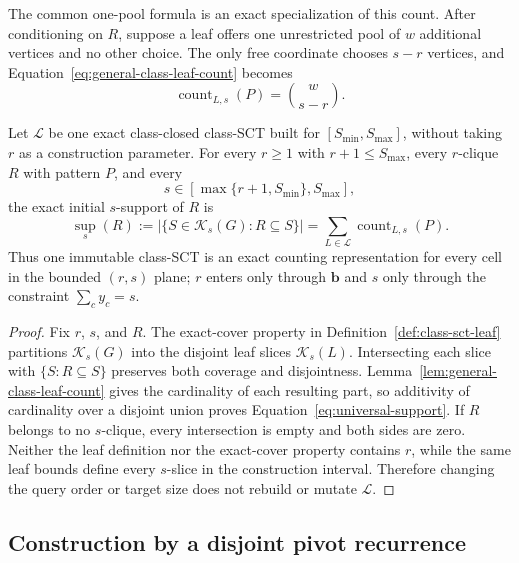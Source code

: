 The common one-pool formula is an exact specialization of this count.
%
After conditioning on $R$, suppose a leaf offers one unrestricted pool of $w$ additional vertices and no other choice.
%
The only free coordinate chooses $s-r$ vertices, and Equation~\eqref{eq:general-class-leaf-count} becomes
\begin{equation}
\label{eq:single-pool-special-case}
\operatorname{count}_{L,s}(P)=\binom{w}{s-r}.
\end{equation}

\begin{theorem}
\label{thm:universal-cpi}
Let $\mathcal L$ be one exact class-closed class-SCT built for $[S_{\min},S_{\max}]$, without taking $r$ as a construction parameter.
%
For every $r\geq1$ with $r+1\leq S_{\max}$, every $r$-clique $R$ with pattern $P$, and every
\[
s\in[\max\{r+1,S_{\min}\},S_{\max}],
\]
the exact initial $s$-support of $R$ is
\begin{equation}
\label{eq:universal-support}
\operatorname{sup}_s(R)
:=
|\{S\in\mathcal K_s(G):R\subseteq S\}|
=
\sum_{L\in\mathcal L}\operatorname{count}_{L,s}(P).
\end{equation}
Thus one immutable class-SCT is an exact counting representation for every cell in the bounded $(r,s)$ plane; $r$ enters only through $\mathbf b$ and $s$ only through the constraint $\sum_cy_c=s$.
\end{theorem}
\begin{proof}
Fix $r$, $s$, and $R$.
%
The exact-cover property in Definition~\ref{def:class-sct-leaf} partitions $\mathcal K_s(G)$ into the disjoint leaf slices $\mathcal K_s(L)$.
%
Intersecting each slice with $\{S:R\subseteq S\}$ preserves both coverage and disjointness.
%
Lemma~\ref{lem:general-class-leaf-count} gives the cardinality of each resulting part, so additivity of cardinality over a disjoint union proves Equation~\eqref{eq:universal-support}.
%
If $R$ belongs to no $s$-clique, every intersection is empty and both sides are zero.
%
Neither the leaf definition nor the exact-cover property contains $r$, while the same leaf bounds define every $s$-slice in the construction interval.
%
Therefore changing the query order or target size does not rebuild or mutate $\mathcal L$.
\end{proof}

\subsection{Construction by a disjoint pivot recurrence}
\label{subsec:gen-construction}

